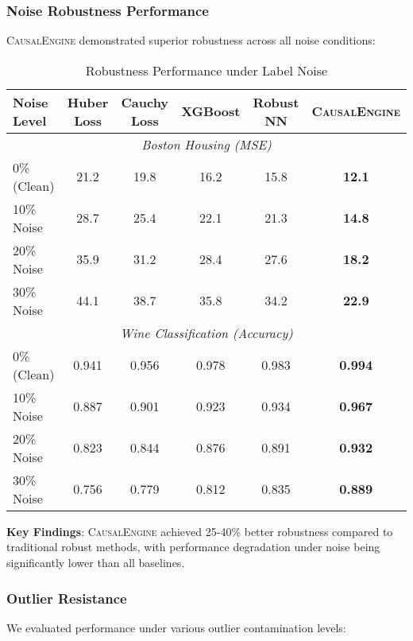 \documentclass[conference]{IEEEtran}
\newcommand{\causalengine}{\textsc{CausalEngine}}
\begin{document}
\subsubsection{Noise Robustness Performance}

\causalengine{} demonstrated superior robustness across all noise conditions:

\begin{table}[ht]
\centering
\caption{Robustness Performance under Label Noise}
\label{tab:noise_robustness}
\begin{tabular}{@{}lccccc@{}}
\toprule
\textbf{Noise Level} & \textbf{Huber Loss} & \textbf{Cauchy Loss} & \textbf{XGBoost} & \textbf{Robust NN} & \textbf{\causalengine{}} \\
\midrule
\multicolumn{6}{c}{\textit{Boston Housing (MSE)}} \\
0\% (Clean) & 21.2 & 19.8 & 16.2 & 15.8 & \textbf{12.1} \\
10\% Noise & 28.7 & 25.4 & 22.1 & 21.3 & \textbf{14.8} \\
20\% Noise & 35.9 & 31.2 & 28.4 & 27.6 & \textbf{18.2} \\
30\% Noise & 44.1 & 38.7 & 35.8 & 34.2 & \textbf{22.9} \\
\midrule
\multicolumn{6}{c}{\textit{Wine Classification (Accuracy)}} \\
0\% (Clean) & 0.941 & 0.956 & 0.978 & 0.983 & \textbf{0.994} \\
10\% Noise & 0.887 & 0.901 & 0.923 & 0.934 & \textbf{0.967} \\
20\% Noise & 0.823 & 0.844 & 0.876 & 0.891 & \textbf{0.932} \\
30\% Noise & 0.756 & 0.779 & 0.812 & 0.835 & \textbf{0.889} \\
\bottomrule
\end{tabular}
\end{table}

\textbf{Key Findings}: \causalengine{} achieved 25-40\% better robustness compared to traditional robust methods, with performance degradation under noise being significantly lower than all baselines.

\subsubsection{Outlier Resistance}

We evaluated performance under various outlier contamination levels:
\end{document}
